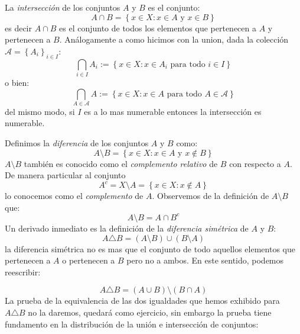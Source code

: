 \documentclass[14pt]{extbook}
\begin{document}
La \emph{intersección} de los conjuntos $A$ y $B$ es el conjunto:
$$
A\cap B = \left\{x\in X: x \in A \text{ y } x \in B\right\}
$$
es decir $A\cap B$ es el conjunto de todos los elementos que pertenecen a $A$ y pertenecen a $B$. Análogamente a como hicimos con la union, dada la colección $\mathcal{A} = \left\{A_i\right\}_{i\in I}$:
$$
\bigcap_{i\in I}A_i := \left\{x\in X: x \in A_i \text{ para todo } i\in I \right\}
$$
\noindent
o bien:
\noindent
$$
\bigcap_{A\in \mathcal{A}}A := \left\{x\in X: x \in A \text{ para todo } A\in \mathcal{A} \right\}
$$
del mismo modo, si $I$ es a lo mas numerable entonces la intersección es numerable.

Definimos la \emph{diferencia} de los conjuntos $A$ y $B$ como:
$$
A\setminus B = \left\{x\in X: x  \in A \text{ y } x\notin B\right\}
$$
$A\setminus B$ también es conocido como el \emph{complemento relativo} de $B$ con respecto a $A$. De manera particular al conjunto 
$$
A^c = X\setminus A = \left\{x\in X: x\notin A\right\}
$$
lo conocemos como el \emph{complemento} de $A$.
Observemos de la definición de $A\setminus B$ que:
$$
A\setminus B = A \cap B^c
$$
Un derivado inmediato es la definición de la \emph{diferencia simétrica} de $A$ y $B$:
$$
A\triangle B = (A\setminus B) \cup (B\setminus A)
$$
la diferencia simétrica no es mas que el conjunto de todo aquellos elementos que pertenecen a $A$ o pertenecen a $B$ pero no a ambos. En este sentido, podemos reescribir:

$$
A\triangle B = (A\cup B) \setminus (B\cap A)
$$
La prueba de la equivalencia de las dos igualdades que hemos exhibido para $A\triangle B$ no la daremos, quedará como ejercicio, sin embargo la prueba tiene fundamento en la distribución de la unión e intersección de conjuntos:
\end{document}
